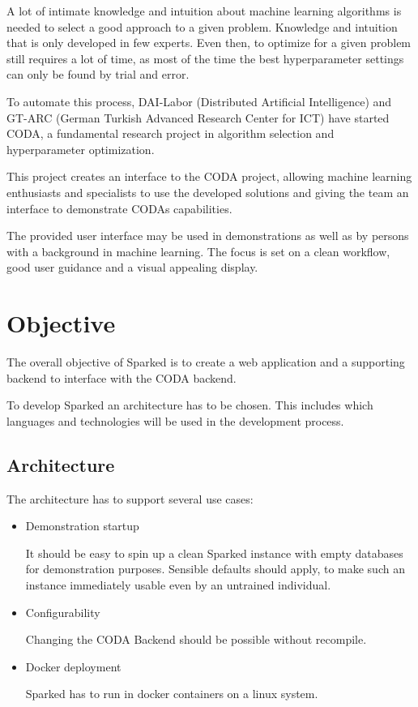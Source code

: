 \documentclass[12pt,a4paper,titlepage,oneside,BCOR1cm]{scrreprt}
\begin{document}
A lot of intimate knowledge and intuition about machine learning algorithms is needed to select a good approach to a given problem. Knowledge and intuition that is only developed in few experts. Even then, to optimize for a given problem still requires a lot of time, as most of the time the best hyperparameter settings can only be found by trial and error.

To automate this process, DAI-Labor (Distributed Artificial Intelligence) and GT-ARC (German Turkish Advanced Research Center for ICT) have started CODA, a fundamental research project in algorithm selection and hyperparameter optimization. \cite{CODA-Steckbrief}

This project creates an interface to the CODA project, allowing machine learning enthusiasts and specialists to use the developed solutions and giving the team an interface to demonstrate CODAs capabilities.

The provided user interface may be used in demonstrations as well as by persons with a background in machine learning. The focus is set on a clean workflow, good user guidance and a visual appealing display.




\chapter{Objective}
The overall objective of Sparked is to create a web application and a supporting backend to interface with the CODA backend. 

To develop Sparked an architecture has to be chosen. This includes which languages and technologies will be used in the development process. 

\section{Architecture}

The architecture has to support several use cases:
\begin{itemize}
  \item Demonstration startup
  
  It should be easy to spin up a clean Sparked instance with empty databases for demonstration purposes. Sensible defaults should apply, to make such an instance immediately usable even by an untrained individual.

  \item Configurability

  Changing the CODA Backend should be possible without recompile.

  \item Docker deployment

  Sparked has to run in docker containers on a linux system.

\end{itemize}
\end{document}
